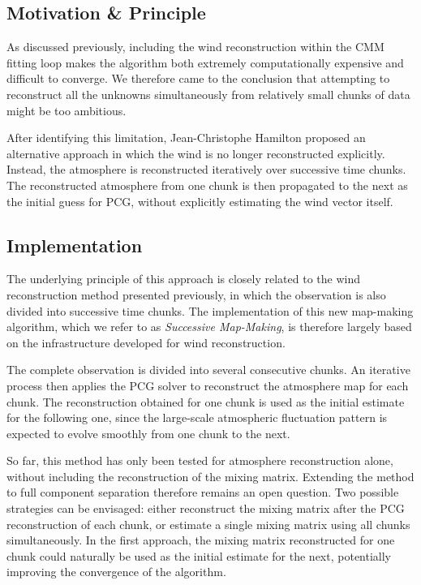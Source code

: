 \documentclass[../../thesis.tex]{subfiles}
\begin{document}
\subsection{Motivation \& Principle}

As discussed previously, including the wind reconstruction within the CMM fitting loop makes the algorithm both extremely computationally expensive and difficult to converge. We therefore came to the conclusion that attempting to reconstruct all the unknowns simultaneously from relatively small chunks of data might be too ambitious.

After identifying this limitation, Jean-Christophe Hamilton proposed an alternative approach in which the wind is no longer reconstructed explicitly. Instead, the atmosphere is reconstructed iteratively over successive time chunks. The reconstructed atmosphere from one chunk is then propagated to the next as the initial guess for PCG, without explicitly estimating the wind vector itself.

\subsection{Implementation}

The underlying principle of this approach is closely related to the wind reconstruction method presented previously, in which the observation is also divided into successive time chunks. The implementation of this new map-making algorithm, which we refer to as \emph{Successive Map-Making}, is therefore largely based on the infrastructure developed for wind reconstruction.

The complete observation is divided into several consecutive chunks. An iterative process then applies the PCG solver to reconstruct the atmosphere map for each chunk. The reconstruction obtained for one chunk is used as the initial estimate for the following one, since the large-scale atmospheric fluctuation pattern is expected to evolve smoothly from one chunk to the next.

So far, this method has only been tested for atmosphere reconstruction alone, without including the reconstruction of the mixing matrix. Extending the method to full component separation therefore remains an open question. Two possible strategies can be envisaged: either reconstruct the mixing matrix after the PCG reconstruction of each chunk, or estimate a single mixing matrix using all chunks simultaneously. In the first approach, the mixing matrix reconstructed for one chunk could naturally be used as the initial estimate for the next, potentially improving the convergence of the algorithm.
\end{document}
